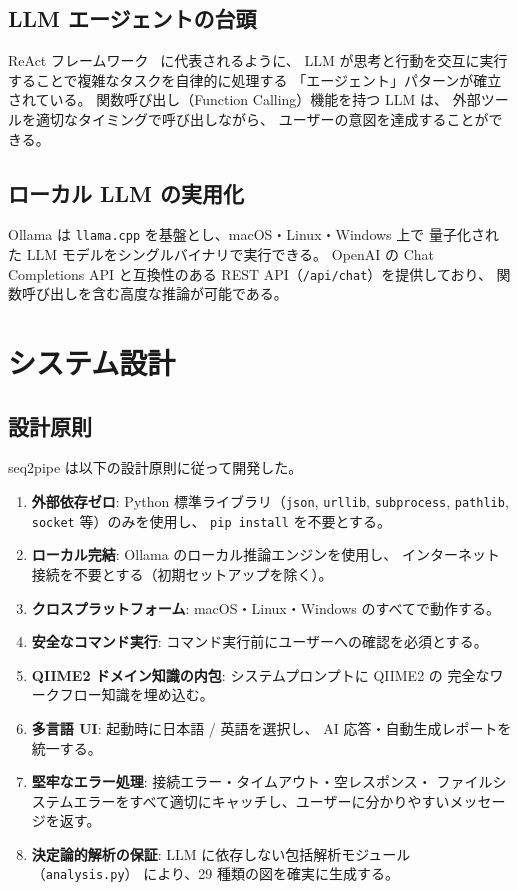 \documentclass[12pt, a4paper]{article}
\begin{document}
\subsection{LLM エージェントの台頭}

ReAct フレームワーク~\cite{yao2023react} に代表されるように、
LLM が思考と行動を交互に実行することで複雑なタスクを自律的に処理する
「エージェント」パターンが確立されている。
関数呼び出し（Function Calling）機能を持つ LLM は、
外部ツールを適切なタイミングで呼び出しながら、
ユーザーの意図を達成することができる。

\subsection{ローカル LLM の実用化}

Ollama は \texttt{llama.cpp} を基盤とし、macOS・Linux・Windows 上で
量子化された LLM モデルをシングルバイナリで実行できる。
OpenAI の Chat Completions API と互換性のある
REST API（\texttt{/api/chat}）を提供しており、
関数呼び出しを含む高度な推論が可能である。

\section{システム設計}

\subsection{設計原則}

seq2pipe は以下の設計原則に従って開発した。

\begin{enumerate}[leftmargin=2em]
  \item \textbf{外部依存ゼロ}: Python 標準ライブラリ（\texttt{json}, \texttt{urllib},
    \texttt{subprocess}, \texttt{pathlib}, \texttt{socket} 等）のみを使用し、
    \texttt{pip install} を不要とする。
  \item \textbf{ローカル完結}: Ollama のローカル推論エンジンを使用し、
    インターネット接続を不要とする（初期セットアップを除く）。
  \item \textbf{クロスプラットフォーム}: macOS・Linux・Windows のすべてで動作する。
  \item \textbf{安全なコマンド実行}: コマンド実行前にユーザーへの確認を必須とする。
  \item \textbf{QIIME2 ドメイン知識の内包}: システムプロンプトに QIIME2 の
    完全なワークフロー知識を埋め込む。
  \item \textbf{多言語 UI}: 起動時に日本語 / 英語を選択し、
    AI 応答・自動生成レポートを統一する。
  \item \textbf{堅牢なエラー処理}: 接続エラー・タイムアウト・空レスポンス・
    ファイルシステムエラーをすべて適切にキャッチし、ユーザーに分かりやすいメッセージを返す。
  \item \textbf{決定論的解析の保証}: LLM に依存しない包括解析モジュール（\texttt{analysis.py}）
    により、29 種類の図を確実に生成する。
\end{enumerate}
\end{document}
